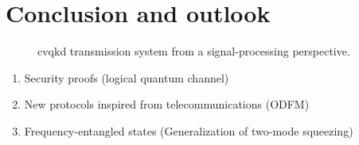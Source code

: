 \chapter*{Conclusion and outlook}


\begin{figure}[htb]
	\centering
	
	\caption{\Gls{cvqkd} transmission system from a signal-processing perspective.}
\end{figure}


\begin{enumerate}
	\item Security proofs (logical quantum channel)
	\item New protocols inspired from telecommunications (ODFM)
	\item Frequency-entangled states (Generalization of two-mode squeezing)
\end{enumerate}